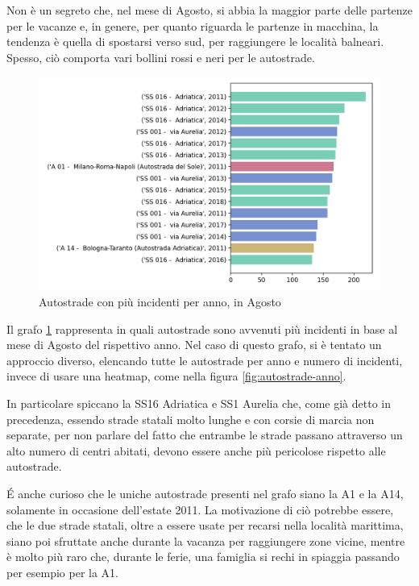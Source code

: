 \documentclass[a4paper,12pt]{report}
\begin{document}
Non è un segreto che, nel mese di Agosto, si abbia la maggior parte delle 
partenze per le vacanze e, in genere, per quanto riguarda le 
partenze in macchina, la tendenza è quella di spostarsi verso sud, 
per raggiungere le località balneari.
Spesso, ciò comporta vari bollini rossi e neri per le autostrade. 

\begin{figure}
    \includegraphics[width=\linewidth]{../src/incidenti/incidenti_aci/agosto/autostrade_anno_agosto.png}
    \caption{Autostrade con più incidenti per anno, in Agosto}
    \label{fig:autostrade-anno-agosto}
\end{figure}

Il grafo \ref{fig:autostrade-anno-agosto} rappresenta in quali autostrade sono avvenuti 
più incidenti in base al mese di Agosto del rispettivo anno. 
Nel caso di questo grafo, si è tentato un approccio diverso, elencando 
tutte le autostrade per anno e numero di incidenti, invece di usare una 
heatmap, come nella figura \ref{fig:autostrade-anno}.

In particolare spiccano la SS16 Adriatica e SS1 Aurelia che, come già 
detto in precedenza, essendo strade statali molto lunghe e con corsie di marcia 
non separate, per non parlare del fatto che entrambe le strade passano attraverso un 
alto numero di centri abitati, devono essere anche più pericolose rispetto alle 
autostrade.

\'E anche curioso che le uniche autostrade presenti nel grafo siano la A1 e la A14, 
solamente in occasione dell'estate 2011. 
La motivazione di ciò potrebbe essere, che le due strade statali, oltre a essere usate per 
recarsi nella località marittima, siano poi sfruttate anche durante la vacanza per 
raggiungere zone vicine, mentre è molto più raro che, durante le ferie, una famiglia 
si rechi in spiaggia passando per esempio per la A1.
\end{document}
